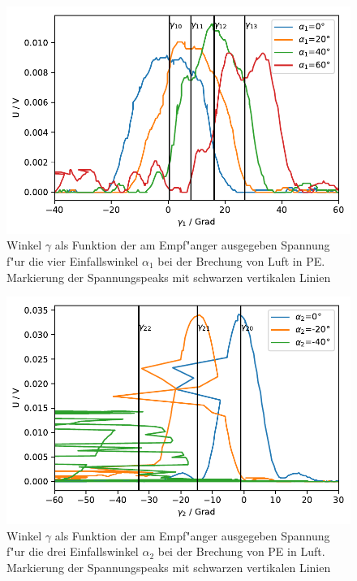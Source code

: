 \documentclass[12pt,a4paper]{article}
\begin{document}
\begin{figure}
	\centering
	\includegraphics[scale=1]{Bilder/Brechung_gamma.pdf}
	\caption{Winkel $\gamma$ als Funktion der am Empf"anger ausgegeben Spannung f"ur die vier Einfallswinkel $\alpha_1$ bei der Brechung von Luft in PE. Markierung der Spannungspeaks mit schwarzen vertikalen Linien}
	\label{Brechung_Rohdaten}
\end{figure}
\begin{figure}
	\centering
	\includegraphics[scale=1]{Bilder/Brechung_gamma2.pdf}
	\caption{Winkel $\gamma$ als Funktion der am Empf"anger ausgegeben Spannung f"ur die drei Einfallswinkel $\alpha_2$ bei der Brechung von PE in Luft. Markierung der Spannungspeaks mit schwarzen vertikalen Linien}
	\label{Brechung2_Rohdaten}
\end{figure}
\end{document}
